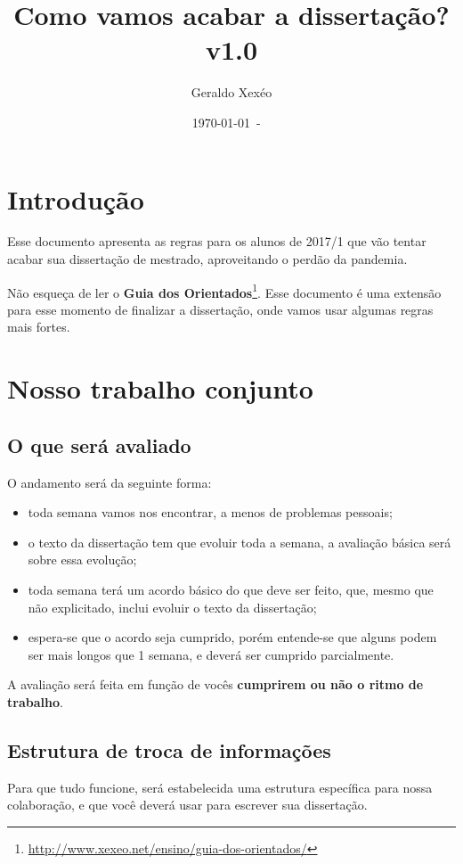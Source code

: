 \documentclass{article}
\title{Como vamos acabar a dissertação? v1.0}
\author{Geraldo Xexéo}
\date{\today\ - \ \currenttime}
\begin{document}
\maketitle
\tableofcontents
\section{Introdução}

Esse documento apresenta as regras para os alunos de 2017/1 que vão tentar acabar sua dissertação de mestrado, aproveitando o perdão da pandemia.

Não esqueça de ler o \textbf{Guia dos Orientados}\footnote{\url{http://www.xexeo.net/ensino/guia-dos-orientados/}}. Esse documento é uma extensão para esse momento de finalizar a dissertação, onde vamos usar algumas regras mais fortes.


\section{Nosso trabalho conjunto}

\subsection{O que será avaliado}

O andamento será da seguinte forma:
\begin{itemize}
    \item toda semana vamos nos encontrar, a menos de problemas pessoais;
    \item o texto da dissertação tem que evoluir toda a semana, a avaliação básica será sobre essa evolução;
    \item toda semana terá um acordo básico do que deve ser feito, que, mesmo que não explicitado, inclui evoluir o texto da dissertação;
    \item espera-se que o acordo seja cumprido, porém entende-se que alguns podem ser mais longos que 1 semana, e deverá ser cumprido parcialmente.
\end{itemize}

A avaliação  será feita em função de vocês \textbf{cumprirem ou não o ritmo de trabalho}.

\subsection{Estrutura de troca de informações}

Para que tudo funcione, será estabelecida uma estrutura específica para nossa colaboração, e que você deverá usar para escrever sua dissertação.
\end{document}
